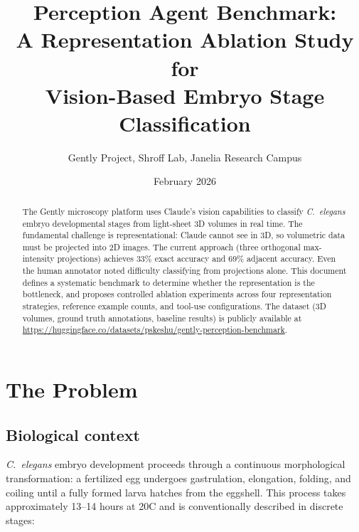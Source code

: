 \documentclass[11pt, a4paper]{article}
\title{%
  \sffamily\bfseries
  Perception Agent Benchmark:\\[4pt]
  \Large A Representation Ablation Study for\\
  Vision-Based Embryo Stage Classification
}
\author{%
  Gently Project, Shroff Lab, Janelia Research Campus
}
\date{February 2026}
\begin{document}
\maketitle

\begin{abstract}
The Gently microscopy platform uses Claude's vision capabilities to classify
\textit{C.\ elegans} embryo developmental stages from light-sheet 3D volumes in real
time. The fundamental challenge is representational: Claude cannot see in 3D, so
volumetric data must be projected into 2D images. The current approach (three
orthogonal max-intensity projections) achieves 33\% exact accuracy and 69\%
adjacent accuracy. Even the human annotator noted difficulty classifying from
projections alone. This document defines a systematic benchmark to determine
whether the representation is the bottleneck, and proposes controlled ablation
experiments across four representation strategies, reference example counts, and
tool-use configurations. The dataset (3D volumes, ground truth annotations,
baseline results) is publicly available at
\url{https://huggingface.co/datasets/pskeshu/gently-perception-benchmark}.
\end{abstract}

\tableofcontents
\vspace{12pt}

\section{The Problem}

\subsection{Biological context}

\textit{C.\ elegans} embryo development proceeds through a continuous
morphological transformation: a fertilized egg undergoes gastrulation, elongation,
folding, and coiling until a fully formed larva hatches from the eggshell. This
process takes approximately 13--14 hours at 20\textdegree C and is conventionally
described in discrete stages:
\end{document}
